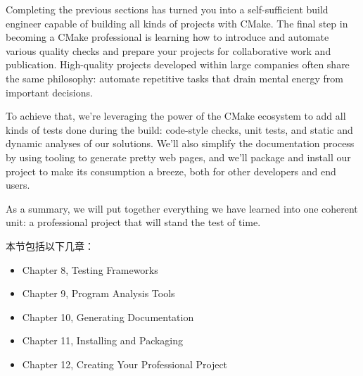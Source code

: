 

Completing the previous sections has turned you into a self-sufficient build engineer capable of building all kinds of projects with CMake. The final step in becoming a CMake professional is learning how to introduce and automate various quality checks and prepare your projects for collaborative work and publication. High-quality projects developed within large companies often share the same philosophy: automate repetitive tasks that drain mental energy from important decisions.

To achieve that, we're leveraging the power of the CMake ecosystem to add all kinds of tests done during the build: code-style checks, unit tests, and static and dynamic analyses of our solutions. We'll also simplify the documentation process by using tooling to generate pretty web pages, and we'll package and install our project to make its consumption a breeze, both for other developers and end users.

As a summary, we will put together everything we have learned into one coherent
unit: a professional project that will stand the test of time.

本节包括以下几章：

\begin{itemize}
\item Chapter 8, Testing Frameworks
\item Chapter 9, Program Analysis Tools
\item Chapter 10, Generating Documentation
\item Chapter 11, Installing and Packaging
\item Chapter 12, Creating Your Professional Project
\end{itemize}